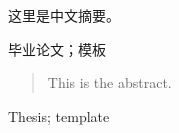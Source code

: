 

\begin{zhaiyao}

这里是中文摘要。
\end{zhaiyao}




\begin{guanjianci}
毕业论文；模板
\end{guanjianci}



\begin{abstract}


This is the abstract.

\end{abstract}



\begin{keywords}
Thesis; template
\end{keywords} 